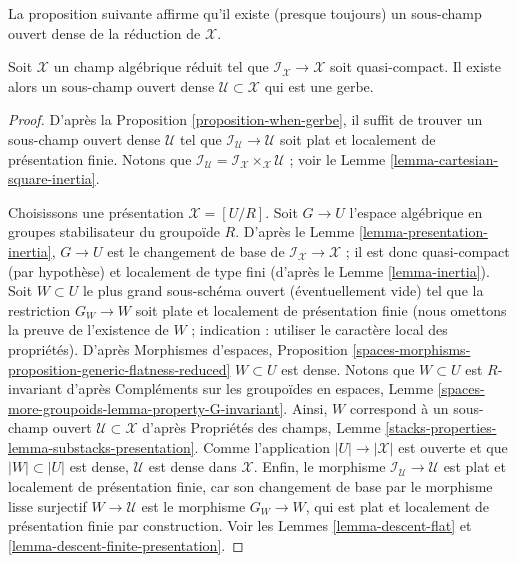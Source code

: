 \medskip\noindent
La proposition suivante affirme qu'il existe (presque toujours) un
sous-champ ouvert dense de la réduction de $\mathcal{X}$.

\begin{proposition}
\label{proposition-open-stratum}
Soit $\mathcal{X}$ un champ algébrique réduit tel que
$\mathcal{I}_\mathcal{X} \to \mathcal{X}$ soit quasi-compact.
Il existe alors un sous-champ ouvert dense
$\mathcal{U} \subset \mathcal{X}$ qui est une gerbe.
\end{proposition}

\begin{proof}
D'après la Proposition \ref{proposition-when-gerbe}, il suffit de trouver un
sous-champ ouvert dense $\mathcal{U}$ tel que
$\mathcal{I}_\mathcal{U} \to \mathcal{U}$ soit plat et localement de
présentation finie. Notons que
$\mathcal{I}_\mathcal{U} =
\mathcal{I}_\mathcal{X} \times_\mathcal{X} \mathcal{U}$ ; voir le
Lemme \ref{lemma-cartesian-square-inertia}.

\medskip\noindent
Choisissons une présentation $\mathcal{X} = [U/R]$. Soit $G \to U$
l'espace algébrique en groupes stabilisateur du groupoïde $R$. D'après le
Lemme \ref{lemma-presentation-inertia}, $G \to U$ est le changement de base
de $\mathcal{I}_\mathcal{X} \to \mathcal{X}$ ; il est donc quasi-compact
(par hypothèse) et localement de type fini (d'après le
Lemme \ref{lemma-inertia}). Soit $W \subset U$ le plus grand sous-schéma
ouvert (éventuellement vide) tel que la restriction $G_W \to W$ soit plate
et localement de présentation finie (nous omettons la preuve de l'existence de
$W$ ; indication : utiliser le caractère local des propriétés). D'après
Morphismes d'espaces, Proposition
\ref{spaces-morphisms-proposition-generic-flatness-reduced}
$W \subset U$ est dense. Notons que $W \subset U$ est $R$-invariant d'après
Compléments sur les groupoïdes en espaces, Lemme
\ref{spaces-more-groupoids-lemma-property-G-invariant}.
Ainsi, $W$ correspond à un sous-champ ouvert
$\mathcal{U} \subset \mathcal{X}$ d'après Propriétés des champs, Lemme
\ref{stacks-properties-lemma-substacks-presentation}.
Comme l'application $|U| \to |\mathcal{X}|$ est ouverte et que
$|W| \subset |U|$ est dense, $\mathcal{U}$ est dense dans $\mathcal{X}$.
Enfin, le morphisme $\mathcal{I}_\mathcal{U} \to \mathcal{U}$ est plat et
localement de présentation finie, car son changement de base par le morphisme
lisse surjectif $W \to \mathcal{U}$ est le morphisme $G_W \to W$, qui est
plat et localement de présentation finie par construction. Voir les
Lemmes \ref{lemma-descent-flat} et
\ref{lemma-descent-finite-presentation}.
\end{proof}

